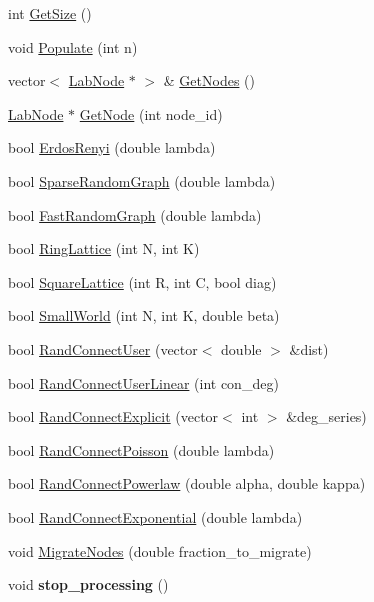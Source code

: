\begin{DoxyCompactItemize}
\item 
int \hyperlink{classelps_1_1_lab_network_ad9ba49a3e440387c3a7f26694faea9e2}{Get\-Size} ()
\item 
void \hyperlink{classelps_1_1_lab_network_ae07f023a5b2cd7f2e5646343c27165cf}{Populate} (int n)
\item 
vector$<$ \hyperlink{classelps_1_1_lab_node}{Lab\-Node} $\ast$ $>$ \& \hyperlink{classelps_1_1_lab_network_a735c4555caac87a1b4f892ed5afafe87}{Get\-Nodes} ()
\item 
\hyperlink{classelps_1_1_lab_node}{Lab\-Node} $\ast$ \hyperlink{classelps_1_1_lab_network_a789165972661c5ce76d08fc8e08f0dea}{Get\-Node} (int node\-\_\-id)
\item 
bool \hyperlink{classelps_1_1_lab_network_ace3bdd2d65f5d00464cb8abf06fdf3af}{Erdos\-Renyi} (double lambda)
\item 
bool \hyperlink{classelps_1_1_lab_network_a49abb9e7a22963fba022c65748ec4242}{Sparse\-Random\-Graph} (double lambda)
\item 
bool \hyperlink{classelps_1_1_lab_network_a0bbd4e833feb4641793830f9f3566127}{Fast\-Random\-Graph} (double lambda)
\item 
bool \hyperlink{classelps_1_1_lab_network_a5ae5c0c311459d444f040eaf43717abc}{Ring\-Lattice} (int N, int K)
\item 
bool \hyperlink{classelps_1_1_lab_network_a7f11fbd1df3dfcf6d81ba1473137ec9c}{Square\-Lattice} (int R, int C, bool diag)
\item 
bool \hyperlink{classelps_1_1_lab_network_a7517a4afba40876c2d55ecbd9512a1c7}{Small\-World} (int N, int K, double beta)
\item 
bool \hyperlink{classelps_1_1_lab_network_ad407f3fba34f4bbe0cbe9ba867dc54d0}{Rand\-Connect\-User} (vector$<$ double $>$ \&dist)
\item 
bool \hyperlink{classelps_1_1_lab_network_a4307b2b2c673f7e834f60ea3a4e8673f}{Rand\-Connect\-User\-Linear} (int con\-\_\-deg)
\item 
bool \hyperlink{classelps_1_1_lab_network_aec222034cb40e92ca38dfa4061dc3329}{Rand\-Connect\-Explicit} (vector$<$ int $>$ \&deg\-\_\-series)
\item 
bool \hyperlink{classelps_1_1_lab_network_a960fab47aa54eafa962e73a29ac15d46}{Rand\-Connect\-Poisson} (double lambda)
\item 
bool \hyperlink{classelps_1_1_lab_network_a5107e01fd7f70e9d8ac3e54abd7003e4}{Rand\-Connect\-Powerlaw} (double alpha, double kappa)
\item 
bool \hyperlink{classelps_1_1_lab_network_aaa119c9d408ba708a5e3d39ac8ef3b9b}{Rand\-Connect\-Exponential} (double lambda)
\item 
void \hyperlink{classelps_1_1_lab_network_afc4aaf1abf21171bc2879c81da7e8b85}{Migrate\-Nodes} (double fraction\-\_\-to\-\_\-migrate)
\item 
\hypertarget{classelps_1_1_lab_network_a0d89975b3151890de887c864642f3f84}{void {\bfseries stop\-\_\-processing} ()}\label{classelps_1_1_lab_network_a0d89975b3151890de887c864642f3f84}


\end{DoxyCompactItemize}
